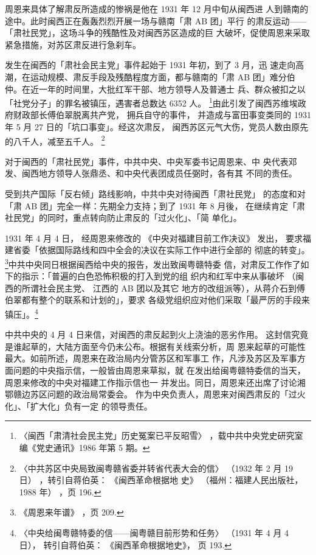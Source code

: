 周恩来具体了解肃反所造成的惨祸是他在 1931 年 12 月中旬从闽西进
人到赣南的途中。此时闽西正在轰轰烈烈开展一场与赣南「肃 AB 团」平行
的肃反运动——「肃社民党」，这场斗争的残酷性及对闽西苏区造成的巨
大破坏，促使周恩来采取紧急措施，对苏区肃反进行急刹车。

发生在闽西的「肃社会民主党」事件起始于 1931 年初，到了 3 月，迅
速走向高潮，在运动规模、肃反手段及残酷程度方面，都与赣南的「肃 AB
团」难分伯仲。在近一年的时间里，大批红军干部、地方领导人及普通士
兵、群众被扣之以「社党分子」的罪名被镇压，遇害者总数达 6352 人。
\footnote{〈闽西「肃清社会民主党」历史冤案已平反昭雪〉
，载中共中央党史研究室编《党史通讯》1986 年第 5 期。}由此引发了闽西苏维埃政府财政部长傅伯翠脱离共产党，
拥兵自守的事件，
并造成与富田事变类同的 1931 年 5 月 27 日的「坑口事变」。经这次肃反，
闽西苏区元气大伤，党员人数由原先的八千人，减至五千人。
\footnote{〈中共苏区中央局致闽粤赣省委并转省代表大会的信〉
（1932 年 2 月 19 日）
，转引自蒋伯英：
《闽西革命根据地
史》
（福州：福建人民出版社，1988 年）
，页 196.} 

对于闽西的「肃社民党」事件，中共中央、中央军委书记周恩来、中
央代表邓发、闽西地方领导人张鼎丞、和中央代表团成员任弼时，各有其
不同的责任。

受到共产国际「反右倾」路线影响，中共中央对待闽西「肃社民党」
的态度和对「肃 AB 团」完全一样：先期全力支持；到了 1931 年 8 月後，
在继续肯定「肃社民党」的同时，重点转向防止肃反的「过火化」、「简
单化」。

1931 年 4 月 4 日，
经周恩来修改的
《中央对福建目前工作决议》
发出，
要求福建省委「依据国际路线和四中全会的决议在实际工作中进行全部的
彻底的转变」。\footnote{《周恩来年谱》
，页 209.}中共中央同日根据闽西给中央的报告，发出致闽粤赣特委
信，对肃反工作作了如下的指示：「普遍的白色恐怖积极的打入到党的组
织内和红军中来从事破坏
（闽西的所谓社会民主党、
江西的 AB 团以及其它
地方的改组派等），从蒋介石到傅伯翠都有整个的联系和计划的」，要求
各级党组织应对他们采取「最严厉的手段来镇压」。\footnote{
〈中央给闽粤赣特委的信——闽粤赣目前形势和任务〉
（1931 年 4 月 4 日）， 转引自蒋伯英：
《闽西革命根据地史》，
页 193.} 

中共中央的 4 月 4 日来信，对闽西的肃反起到火上浇油的恶劣作用。
这封信究竟是谁起草的，大陆方面至今仍未公布。根据有关线索分析，周
恩来起草的可能性最大。如前所述，周恩来在政治局内分管苏区和军事工
作，凡涉及苏区及军事方面问题的中央指示信，一般皆由周恩来草拟，就
在发出给闽粤赣特委信的当天，周恩来修改的中央对福建工作指示信也一
并发出。同日，周恩来还出席了讨论湘鄂赣边苏区问题的政治局常委会。
作为中央负责人，周恩来对闽西肃反的「过火化」、「扩大化」负有一定
的领导责任。

